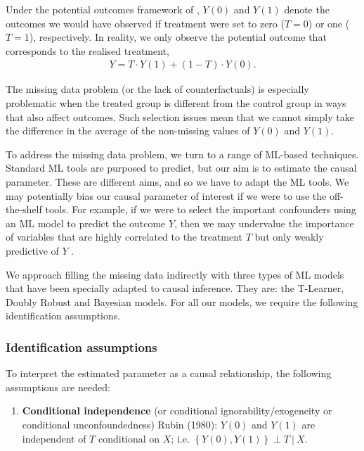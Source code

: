 \documentclass[12pt, a4paper]{article}
\begin{document}
Under the potential outcomes framework of \cite{imbens2015}, $Y(0)$ and $Y(1)$ denote the outcomes we would have observed if treatment were set to zero ($T=0$) or one ($T=1$), respectively. In reality, we only observe the potential outcome that corresponds to the realised treatment,
\begin{align}
Y = T \cdot Y(1) + (1-T) \cdot Y(0).
\end{align}

The missing data problem (or the lack of counterfactuals) is especially problematic when the treated group is different from the control group in ways that also affect outcomes. Such selection issues mean that we cannot simply take the difference in the average of the non-missing values of $Y(0)$ and $Y(1)$.

To address the missing data problem, we turn to a range of ML-based techniques.
Standard ML tools are purposed to predict, but our aim is to estimate the
causal parameter. These are different aims, and so we have to adapt the ML
tools. We may potentially bias our causal parameter of interest if we were to
use the off-the-shelf tools. For example, if we were to select the important
confounders using an ML model to predict the outcome $Y$, then we may
undervalue the importance of variables that are highly correlated to the
treatment $T$ but only weakly predictive of $Y$ \citep{cherno2018}.

We approach filling the missing data indirectly with three types of ML models
that have been specially adapted to causal inference. They are: the T-Learner,
Doubly Robust and Bayesian models. For all our models, we require the following identification assumptions.

\subsubsection*{Identification assumptions}

To interpret the estimated parameter as a causal relationship, the following assumptions are needed:

\begin{enumerate}
  \item \textbf{Conditional independence} (or conditional ignorability/exogeneity or conditional unconfoundedness) Rubin (1980): $Y(0)$ and $Y(1)$ are independent of $T$ conditional on $X$; i.e. $\left\{Y(0), Y(1)\right\} \perp T~|~X$.  
\end{enumerate}
\end{document}
